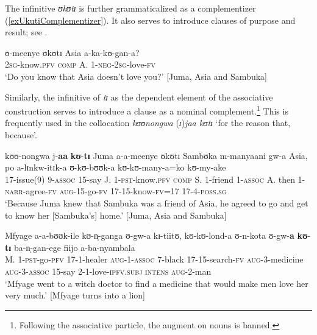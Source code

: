 The infinitive \textit{ʊkʊtɪ} is further grammaticalized as a complementizer (\ref{exUkutiComplementizer}). It also serves to introduce clauses of purpose and result; see .
\begin{exe}
\ex\label{exUkutiComplementizer}
\gll ʊ-meenye ʊkʊtɪ Asia a-ka-kʊ-gan-a?\\
\textsc{2sg}-know.\textsc{pfv} \textsc{comp} A. 1-\textsc{neg}-\textsc{2sg}-love-\textsc{fv}\\
\glt `Do you know that Asia doesn't love you?' [Juma, Asia and Sambuka]
\end{exe}

Similarly, the infinitive of \textit{tɪ} as the dependent element of the associative construction serves to introduce a clause as a nominal complement.\footnote{Following the associative particle, the augment on nouns is banned.} This is frequently used in the collocation \textit{kʊʊnongwa} (\textit{ɪ})\textit{jaa kʊtɪ} `for the reason that, because'.

\begin{exe}
\ex \label{exkunongwajaa} \gll kʊʊ-nongwa j-\textbf{aa} \textbf{kʊ}-\textbf{tɪ} Juma a-a-meenye ʊkʊtɪ Sambʊka m-manyaani gw-a Asia, po a-lɪnkw-itɪk-a ʊ-kʊ-bʊʊk-a kʊ-kʊ-many-a=ko kʊ-my-ake\\
17-issue(9) 9-\textsc{assoc} 15-say J. 1-\textsc{pst}-know.\textsc{pfv} \textsc{comp} S. 1-friend 1-\textsc{assoc} A. then 1-\textsc{narr}-agree-\textsc{fv} \textsc{aug}-15-go-\textsc{fv} 17-15-know-\textsc{fv}=17 17-4-\textsc{poss.sg}\\
\glt `Because Juma knew that Sambuka was a friend of Asia, he agreed to go and get to know her [Sambuka's] home.' [Juma, Asia and Sambuka]

\ex \gll Mfyage a-a-bʊʊk-ile kʊ-n̩-ganga ʊ-gw-a kɪ-tiitʊ, kʊ-kʊ-lond-a ʊ-n-kota ʊ-gw-\textbf{a} \textbf{kʊ}-\textbf{tɪ} ba-n̩-gan-ege fiijo a-ba-nyambala\\
M. 1-\textsc{pst}-go-\textsc{pfv} 17-1-healer \textsc{aug}-1-\textsc{assoc} 7-black 17-15-search-\textsc{fv} \textsc{aug}-3-medicine \textsc{aug}-3-\textsc{assoc} 15-say 2-1-love-\textsc{ipfv.subj} \textsc{intens} \textsc{aug}-2-man\\
\glt `Mfyage went to a witch doctor to find a medicine that would make men love her very much.' [Mfyage turns into a lion] 
\end{exe}

